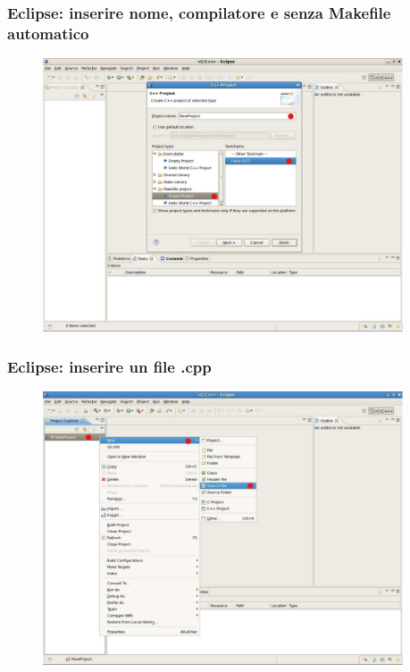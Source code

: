 \documentclass{beamer}
\begin{document}

\begin{frame}[fragile]

    \frametitle{Eclipse: inserire nome, compilatore e senza Makefile automatico}

    \begin{figure}
        \centering
        \includegraphics[width=0.95\textwidth]{./images/eclipse2}
    \end{figure}

\end{frame}


\begin{frame}[fragile]

    \frametitle{Eclipse: inserire un file .cpp}

    \begin{figure}
        \centering
        \includegraphics[width=0.95\textwidth]{./images/eclipse3}
    \end{figure}

\end{frame}
\end{document}
